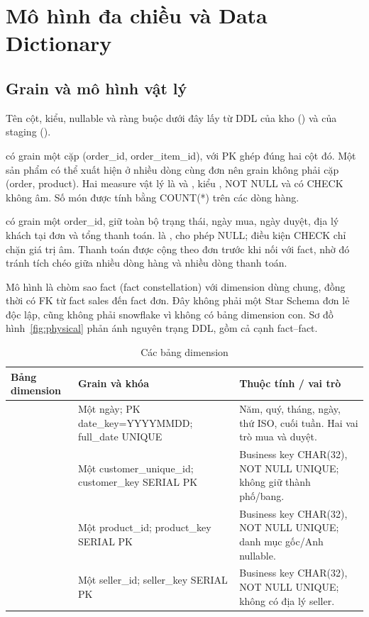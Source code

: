 \section{Mô hình đa chiều và Data Dictionary}
\subsection{Grain và mô hình vật lý}
Tên cột, kiểu, nullable và ràng buộc dưới đây lấy từ DDL của kho () và của staging ().

 có grain một cặp (order\_id, order\_item\_id), với PK ghép đúng hai cột đó. Một sản phẩm có thể xuất hiện ở nhiều dòng cùng đơn nên grain không phải cặp (order, product). Hai measure vật lý là  và , kiểu , NOT NULL và có CHECK không âm. Số món được tính bằng COUNT(*) trên các dòng hàng.

 có grain một order\_id, giữ toàn bộ trạng thái, ngày mua, ngày duyệt, địa lý khách tại đơn và tổng thanh toán.  là , cho phép NULL; điều kiện CHECK chỉ chặn giá trị âm. Thanh toán được cộng theo đơn trước khi nối với fact, nhờ đó tránh tích chéo giữa nhiều dòng hàng và nhiều dòng thanh toán.

Mô hình là chòm sao fact (fact constellation) \cite{kimball} với dimension dùng chung, đồng thời có FK từ fact sales đến fact đơn. Đây không phải một Star Schema đơn lẻ độc lập, cũng không phải snowflake vì không có bảng dimension con. Sơ đồ hình~\ref{fig:physical} phản ánh nguyên trạng DDL, gồm cả cạnh fact--fact.

\begin{table}[H]\centering\small\renewcommand{\arraystretch}{1.15}
\begin{tabularx}{\linewidth}{p{3cm}YY}
\toprule Bảng dimension & Grain và khóa & Thuộc tính / vai trò\\\midrule
{} & Một ngày; PK date\_key=YYYYMMDD; full\_date UNIQUE & Năm, quý, tháng, ngày, thứ ISO, cuối tuần. Hai vai trò mua và duyệt.\\
 & Một customer\_unique\_id; customer\_key SERIAL PK & Business key CHAR(32), NOT NULL UNIQUE; không giữ thành phố/bang.\\
 & Một product\_id; product\_key SERIAL PK & Business key CHAR(32), NOT NULL UNIQUE; danh mục gốc/Anh nullable.\\
 & Một seller\_id; seller\_key SERIAL PK & Business key CHAR(32), NOT NULL UNIQUE; không có địa lý seller.\\
\bottomrule\end{tabularx}
\caption{Các bảng dimension}
\end{table}

